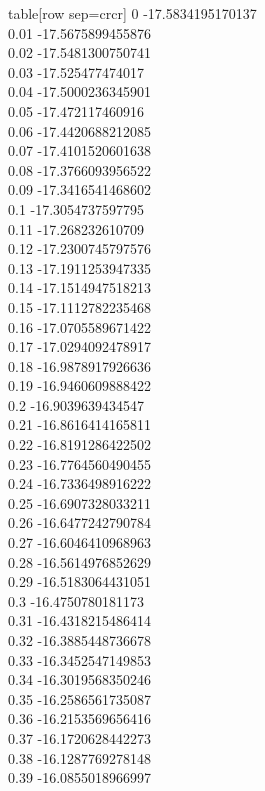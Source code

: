   table[row sep=crcr]{%
0	-17.5834195170137\\
0.01	-17.5675899455876\\
0.02	-17.5481300750741\\
0.03	-17.525477474017\\
0.04	-17.5000236345901\\
0.05	-17.472117460916\\
0.06	-17.4420688212085\\
0.07	-17.4101520601638\\
0.08	-17.3766093956522\\
0.09	-17.3416541468602\\
0.1	-17.3054737597795\\
0.11	-17.268232610709\\
0.12	-17.2300745797576\\
0.13	-17.1911253947335\\
0.14	-17.1514947518213\\
0.15	-17.1112782235468\\
0.16	-17.0705589671422\\
0.17	-17.0294092478917\\
0.18	-16.9878917926636\\
0.19	-16.9460609888422\\
0.2	-16.9039639434547\\
0.21	-16.8616414165811\\
0.22	-16.8191286422502\\
0.23	-16.7764560490455\\
0.24	-16.7336498916222\\
0.25	-16.6907328033211\\
0.26	-16.6477242790784\\
0.27	-16.6046410968963\\
0.28	-16.5614976852629\\
0.29	-16.5183064431051\\
0.3	-16.4750780181173\\
0.31	-16.4318215486414\\
0.32	-16.3885448736678\\
0.33	-16.3452547149853\\
0.34	-16.3019568350246\\
0.35	-16.2586561735087\\
0.36	-16.2153569656416\\
0.37	-16.1720628442273\\
0.38	-16.1287769278148\\
0.39	-16.0855018966997\\
}
